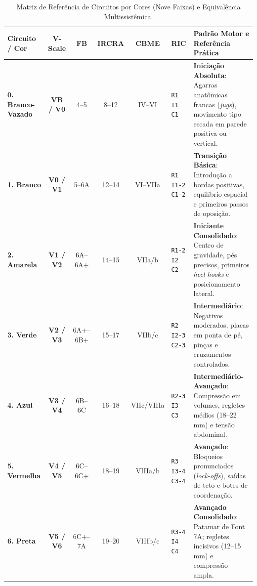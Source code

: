 \begin{table}[!htbp]
\centering
\caption{Matriz de Referência de Circuitos por Cores (Nove Faixas) e Equivalência Multissistêmica.}
\label{tab:circuitos_referencia}
\scriptsize
\renewcommand{\arraystretch}{1.15}
\begin{tabularx}{\linewidth}{p{2.55cm}ccccp{1.8cm}X}
\toprule
\textbf{Circuito / Cor} & \textbf{V-Scale} & \textbf{FB} & \textbf{IRCRA} & \textbf{CBME} & \textbf{RIC} & \textbf{Padrão Motor e Referência Prática} \\
\midrule
\colorbox{tagwhitehollow}{\strut\color{black}\textbf{0. Branco-Vazado}} & \textbf{VB / V0} & 4--5 & 8--12 & IV--VI & \texttt{R1 I1 C1} & \textbf{Iniciação Absoluta}: Agarras anatômicas francas (\textit{jugs}), movimento tipo escada em parede positiva ou vertical. \\
\rowcolor{rowgray}
\colorbox{tagwhite}{\strut\color{black}\textbf{1. Branco}} & \textbf{V0 / V1} & 5--6A & 12--14 & VI--VIIa & \texttt{R1 I1-2 C1-2} & \textbf{Transição Básica}: Introdução a bordas positivas, equilíbrio espacial e primeiros passos de oposição. \\
\colorbox{tagyellow}{\strut\color{black}\textbf{2. Amarela}} & \textbf{V1 / V2} & 6A--6A+ & 14--15 & VIIa/b & \texttt{R1-2 I2 C2} & \textbf{Iniciante Consolidado}: Centro de gravidade, pés precisos, primeiros \textit{heel hooks} e posicionamento lateral. \\
\rowcolor{rowgray}
\colorbox{taggreen}{\strut\color{white}\textbf{3. Verde}} & \textbf{V2 / V3} & 6A+--6B+ & 15--17 & VIIb/c & \texttt{R2 I2-3 C2-3} & \textbf{Intermediário}: Negativos moderados, placas em ponta de pé, pinças e cruzamentos controlados. \\
\colorbox{tagblue}{\strut\color{white}\textbf{4. Azul}} & \textbf{V3 / V4} & 6B--6C & 16--18 & VIIc/VIIIa & \texttt{R2-3 I3 C3} & \textbf{Intermediário-Avançado}: Compressão em volumes, regletes médios (18--22\,mm) e tensão abdominal. \\
\rowcolor{rowgray}
\colorbox{tagred}{\strut\color{white}\textbf{5. Vermelha}} & \textbf{V4 / V5} & 6C--6C+ & 18--19 & VIIIa/b & \texttt{R3 I3-4 C3-4} & \textbf{Avançado}: Bloqueios pronunciados (\textit{lock-offs}), saídas de teto e botes de coordenação. \\
\colorbox{tagblack}{\strut\color{white}\textbf{6. Preta}} & \textbf{V5 / V6} & 6C+--7A & 19--20 & VIIIb/c & \texttt{R3-4 I4 C4} & \textbf{Avançado Consolidado}: Patamar de Font 7A; regletes incisivos (12--15\,mm) e compressão ampla. \\

\end{tabularx}
\end{table}
